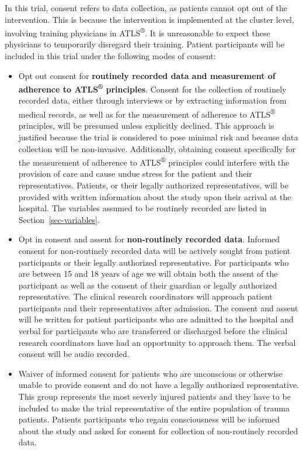 \documentclass[
]{scrartcl}
\providecommand{\tightlist}{%
  \setlength{\itemsep}{0pt}\setlength{\parskip}{0pt}}\usepackage{longtable,booktabs,array}
\begin{document}
In this trial, consent refers to data collection, as patients cannot opt
out of the intervention. This is because the intervention is implemented
at the cluster level, involving training physicians in
ATLS\textsuperscript{®}. It is unreasonable to expect these physicians
to temporarily disregard their training. Patient participants will be
included in this trial under the following modes of consent:

\begin{itemize}
\tightlist
\item
  Opt out consent for \textbf{routinely recorded data and measurement of
  adherence to ATLS\textsuperscript{®} principles}. Consent for the
  collection of routinely recorded data, either through interviews or by
  extracting information from medical records, as well as for the
  measurement of adherence to ATLS\textsuperscript{®} principles, will
  be presumed unless explicitly declined. This approach is justified
  because the trial is considered to pose minimal risk and because data
  collection will be non-invasive. Additionally, obtaining consent
  specifically for the measurement of adherence to
  ATLS\textsuperscript{®} principles could interfere with the provision
  of care and cause undue stress for the patient and their
  representatives. Patients, or their legally authorized
  representatives, will be provided with written information about the
  study upon their arrival at the hospital. The variables assumed to be
  routinely recorded are listed in Section~\ref{sec-variables}.
\item
  Opt in consent and assent for \textbf{non-routinely recorded data}.
  Informed consent for non-routinely recorded data will be actively
  sought from patient participants or their legally authorized
  representative. For participants who are between 15 and 18 years of
  age we will obtain both the assent of the participant as well as the
  consent of their guardian or legally authorized representative. The
  clinical research coordinators will approach patient participants and
  their representatives after admission. The consent and assent will be
  written for patient participants who are admitted to the hospital and
  verbal for participants who are transferred or discharged before the
  clinical research coordinators have had an opportunity to approach
  them. The verbal consent will be audio recorded.
\item
  Waiver of informed consent for patients who are unconscious or
  otherwise unable to provide consent and do not have a legally
  authorized representative. This group represents the most severly
  injured patients and they have to be included to make the trial
  representative of the entire population of trauma patients. Patients
  participants who regain consciousness will be informed about the study
  and asked for consent for collection of non-routinely recorded data.
\end{itemize}
\end{document}
